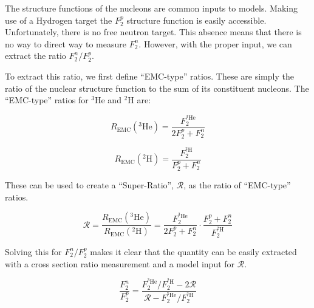 \label{sec:F2ratio}
The structure functions of the nucleons are common inputs to models. Making use of a Hydrogen target the $F_2^p$ structure function is easily accessible. Unfortunately, there is no free neutron target. This absence means that there is no way to direct way to measure $F_2^n$. However, with the proper input, we can extract the ratio $F_2^n/F_2^p$.

To extract this ratio, we first define ``EMC-type'' ratios. These are simply the ratio of the nuclear structure function to the sum of its constituent nucleons. The ``EMC-type'' ratios for $^3$He and $^2$H are:

\begin{equation}
	R_{\text{EMC}}\left(^3\text{He}\right) = \frac{F_2^{^3\text{He}}}{2F_2^p + F_2^n}
\end{equation}

\begin{equation}
	R_{\text{EMC}}\left(^2\text{H}\right) = \frac{F_2^{^2\text{H}}}{F_2^p + F_2^n}
\end{equation}

These can be used to create a ``Super-Ratio'', $\mathcal{R}$, as the ratio of ``EMC-type'' ratios.

\begin{equation}
	\mathcal{R} = \frac{R_{\text{EMC}}\left(^3\text{He}\right)}{R_{\text{EMC}}\left(^2\text{H}\right)} = \frac{F_2^{^3\text{He}}}{2F_2^p + F_2^n} \cdot \frac{F_2^p + F_2^n}{F_2^{^2\text{H}}}
\end{equation}

Solving this for $F_2^n/F_2^p$ makes it clear that the quantity can be easily extracted with a cross section ratio measurement and a model input for $\mathcal{R}$.

\begin{equation}
	\frac{F_2^n}{F_2^p} = \frac{F_2^{^3\text{He}}/F_2^{^2\text{H}} - 2\mathcal{R}}{\mathcal{R} - F_2^{^3\text{He}}/F_2^{^2\text{H}}}
\end{equation}